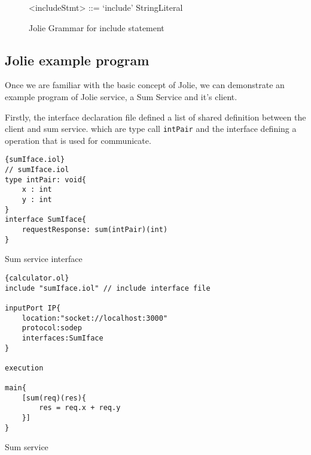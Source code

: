 \begin{figure}[h]
    \begin{framed}
        \begin{grammar}
            <includeStmt> ::= `include' StringLiteral
        \end{grammar}
    \end{framed}
    \caption{Jolie Grammar for include statement}
    \label{fig:jolie-definition}
\end{figure}

\subsection{Jolie example program}

Once we are familiar with the basic concept of Jolie, we can demonstrate an example program of Jolie service, a Sum Service and it's client.

Firstly, the interface declaration file defined a list of shared definition between the client and sum service. which are type call \texttt{intPair} and the interface defining a operation that is used for communicate.

\begin{listing}[h]
    \lstset{language=Jolie,
        style=codeStyle
    }
    \begin{lstlisting}[frame=tlrb]{sumIface.iol}
// sumIface.iol
type intPair: void{
    x : int
    y : int
}
interface SumIface{
    requestResponse: sum(intPair)(int)
}
\end{lstlisting}
    \caption{Sum service interface}
    \label{list:example-iol}
\end{listing}

\begin{listing}[h]

    \lstset{language=Jolie,
        style=codeStyle,
        numbers=left,
        firstnumber=1
    }
    \begin{lstlisting}[frame=tlrb]{calculator.ol}
include "sumIface.iol" // include interface file

inputPort IP{
    location:"socket://localhost:3000"
    protocol:sodep 
    interfaces:SumIface
}

execution 

main{
    [sum(req)(res){
        res = req.x + req.y
    }]
}
\end{lstlisting}
    \caption{Sum service}
    \label{list:example-sum}
\end{listing}

